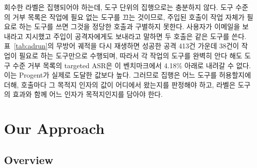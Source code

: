 \documentclass[acmsmall,screen,review,anonymous]{acmart}
\begin{document}
회수한 라벨은 집행되어야 하는데, 도구 단위의 집행으로는 충분하지 않다. 도구 수준의 거부 목록은 작업에 필요 없는 도구를 끄는 것이므로, 주입된 호출이 작업 자체가 필요로 하는 도구를 쓰면 그것을 정당한 호출과 구별하지 못한다. 사용자가 이메일을 보내라고 지시했고 주입이 공격자에게도 보내라고 말하면 두 호출은 같은 도구를 쓴다. 표~\ref{tab:adrun}의 무방어 궤적을 다시 재생하면 성공한 공격 413건 가운데 38건이 작업이 필요로 하는 도구만으로 수행되며, 따라서 각 작업의 도구를 완벽히 안다 해도 도구 수준 거부 목록의 targeted ASR은 이 벤치마크에서 4.18\% 아래로 내려갈 수 없다. 이는 Progent가 실제로 도달한 값보다 높다. 그러므로 집행은 어느 도구를 허용할지에 더해, 호출마다 그 목적지 인자의 값이 어디에서 왔는지를 판정해야 하고, 라벨은 도구의 효과와 함께 어느 인자가 목적지인지를 담아야 한다.


\section{Our Approach}
\label{sec:approach}

\subsection{Overview}
\label{sec:approach:overview}
\end{document}
